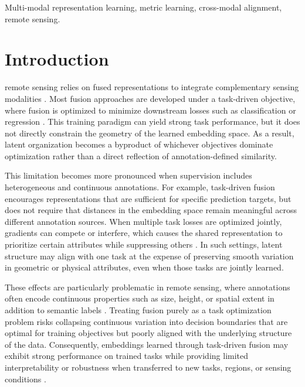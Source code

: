 \documentclass[lettersize,journal]{IEEEtran}
\begin{document}
\begin{IEEEkeywords}
Multi-modal representation learning, metric learning, cross-modal alignment, remote sensing.
\end{IEEEkeywords}

\section{Introduction}
 remote sensing relies on fused representations to integrate complementary sensing modalities \cite{chen2024novel}. Most fusion approaches are developed under a task-driven objective, where fusion is optimized to minimize downstream losses such as classification or regression \cite{bai2025task}. This training paradigm can yield strong task performance, but it does not directly constrain the geometry of the learned embedding space. As a result, latent organization becomes a byproduct of whichever objectives dominate optimization rather than a direct reflection of annotation-defined similarity.

This limitation becomes more pronounced when supervision includes heterogeneous and continuous annotations. For example, task-driven fusion encourages representations that are sufficient for specific prediction targets, but does not require that distances in the embedding space remain meaningful across different annotation sources. When multiple task losses are optimized jointly, gradients can compete or interfere, which causes the shared representation to prioritize certain attributes while suppressing others \cite{wang2025multi}. In such settings, latent structure may align with one task at the expense of preserving smooth variation in geometric or physical attributes, even when those tasks are jointly learned.

These effects are particularly problematic in remote sensing, where annotations often encode continuous properties such as size, height, or spatial extent in addition to semantic labels \cite{sun2023single}. Treating fusion purely as a task optimization problem risks collapsing continuous variation into decision boundaries that are optimal for training objectives but poorly aligned with the underlying structure of the data. Consequently, embeddings learned through task-driven fusion may exhibit strong performance on trained tasks while providing limited interpretability or robustness when transferred to new tasks, regions, or sensing conditions \cite{saidi2024deep}.
\end{document}
